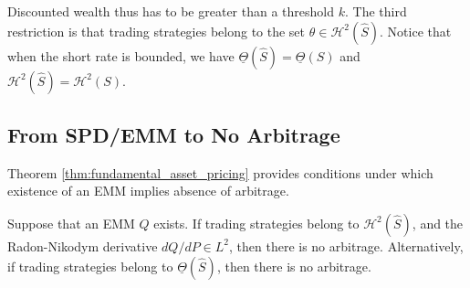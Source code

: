 \documentclass[\topdir/lecture\_notes.tex]{subfiles}
\begin{document}
Discounted wealth thus has to be greater than a threshold $k$. The third restriction is that trading strategies belong to the set $\theta \in \mathcal{H}^{2}(\hat{S})$. Notice that when the short rate is bounded, we have $\underline{\Theta}(\hat{S})=\underline{\Theta}(S)$ and $\mathcal{H}^{2}(\hat{S})=\mathcal{H}^{2}(S)$.

\subsection{From SPD/EMM to No Arbitrage}
Theorem \ref{thm:fundamental_asset_pricing} provides conditions under which existence of an EMM implies absence of arbitrage.

\begin{theorem}\label{thm:fundamental_asset_pricing}
Suppose that an EMM $Q$ exists. If trading strategies belong to $\mathcal{H}^{2}(\hat{S})$, and the Radon-Nikodym derivative $d Q / d P \in L^{2}$, then there is no arbitrage. Alternatively, if trading strategies belong to $\underline{\Theta}(\hat{S})$, then there is no arbitrage.
\end{theorem}
\end{document}
